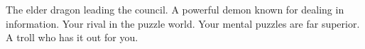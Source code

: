\documentclass[char]{guildcamp2}
\begin{document}
\begin{contacts}
  \contact{\cOnyx{}} The elder dragon leading the council.
  \contact{\cDemon{}} A powerful demon known for dealing in information.
  \contact{\cMinotaur{}} Your rival in the puzzle world. Your mental puzzles are far superior.
  \contact{\cTroll{}} A troll who has it out for you.
\end{contacts}
\end{document}
